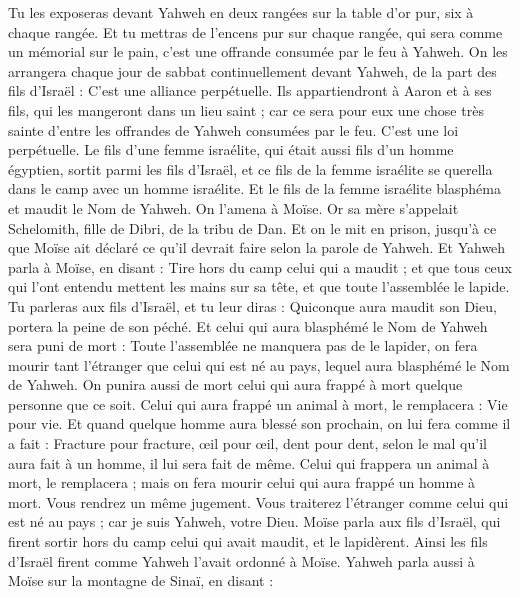 \begin{multicols}{2}
Tu les exposeras devant Yahweh en deux rangées sur la table d’or pur, six à chaque rangée.
Et tu mettras de l'encens pur sur chaque rangée, qui sera comme un mémorial sur le pain, c'est une offrande consumée par le feu à Yahweh.
On les arrangera chaque jour de sabbat continuellement devant Yahweh, de la part des fils d’Israël : C'est une alliance perpétuelle.
Ils appartiendront à Aaron et à ses fils, qui les mangeront dans un lieu saint ; car ce sera pour eux une chose très sainte d'entre les offrandes de Yahweh consumées par le feu. C'est une loi perpétuelle.
Le fils d'une femme israélite, qui était aussi fils d'un homme égyptien, sortit parmi les fils d'Israël, et ce fils de la femme israélite se querella dans le camp avec un homme israélite.
Et le fils de la femme israélite blasphéma et maudit le Nom de Yahweh. On l'amena à Moïse. Or sa mère s'appelait Schelomith, fille de Dibri, de la tribu de Dan.
Et on le mit en prison, jusqu'à ce que Moïse ait déclaré ce qu'il devrait faire selon la parole de Yahweh.
Et Yahweh parla à Moïse, en disant :
Tire hors du camp celui qui a maudit ; et que tous ceux qui l'ont entendu mettent les mains sur sa tête, et que toute l'assemblée le lapide.
Tu parleras aux fils d'Israël, et tu leur diras : Quiconque aura maudit son Dieu, portera la peine de son péché.
Et celui qui aura blasphémé le Nom de Yahweh sera puni de mort : Toute l'assemblée ne manquera pas de le lapider, on fera mourir tant l'étranger que celui qui est né au pays, lequel aura blasphémé le Nom de Yahweh.
On punira aussi de mort celui qui aura frappé à mort quelque personne que ce soit.
Celui qui aura frappé un animal à mort, le remplacera : Vie pour vie.
Et quand quelque homme aura blessé son prochain, on lui fera comme il a fait :
Fracture pour fracture, œil pour œil, dent pour dent, selon le mal qu'il aura fait à un homme, il lui sera fait de même.
Celui qui frappera un animal à mort, le remplacera ; mais on fera mourir celui qui aura frappé un homme à mort.
Vous rendrez un même jugement. Vous traiterez l'étranger comme celui qui est né au pays ; car je suis Yahweh, votre Dieu.
Moïse parla aux fils d'Israël, qui firent sortir hors du camp celui qui avait maudit, et le lapidèrent. Ainsi les fils d'Israël firent comme Yahweh l'avait ordonné à Moïse.
\VerseOne{}Yahweh parla aussi à Moïse sur la montagne de Sinaï, en disant :

\end{multicols}
